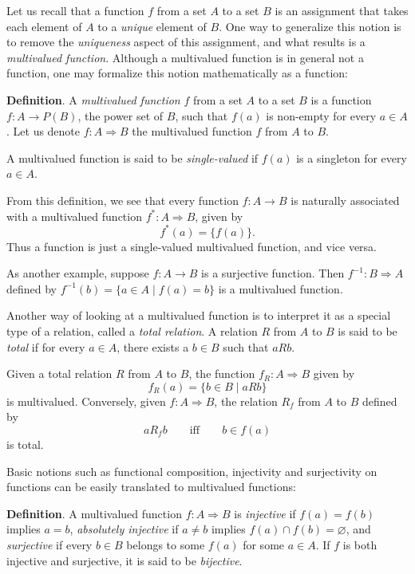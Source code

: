 \documentclass[12pt]{article}
\begin{document}
Let us recall that a function $f$ from a set $A$ to a set $B$ is an assignment that takes each element of $A$ to a \emph{unique} element of $B$.  One way to generalize this notion is to remove the \emph{uniqueness} aspect of this assignment, and what results is a \emph{multivalued function}.  Although a multivalued function is in general not a function, one may formalize this notion mathematically as a function:

\textbf{Definition}.  A \emph{multivalued function} $f$ from a set $A$ to a set $B$ is a function $f: A\to P(B)$, the power set of $B$, such that $f(a)$ is non-empty for every $a\in A$.  Let us denote $f:A\Rightarrow B$ the multivalued function $f$ from $A$ to $B$.  

A multivalued function is said to be \emph{single-valued} if $f(a)$ is a singleton for every $a\in A$.

From this definition, we see that every function $f:A\to B$ is naturally associated with a multivalued function $f^*:A\Rightarrow B$, given by $$f^*(a)=\lbrace f(a)\rbrace.$$  Thus a function is just a single-valued multivalued function, and vice versa.

As another example, suppose $f:A\to B$ is a surjective function.  Then $f^{-1}:B\Rightarrow A$ defined by $f^{-1}(b)=\lbrace a\in A \mid f(a)=b\rbrace$ is a multivalued function.

Another way of looking at a multivalued function is to interpret it as a special type of a relation, called a \emph{total relation}.  A relation $R$ from $A$ to $B$ is said to be \emph{total} if for every $a\in A$, there exists a $b\in B$ such that $aRb$.

Given a total relation $R$ from $A$ to $B$, the function $f_R: A\Rightarrow B$ given by $$f_R(a)=\lbrace b\in B\mid aRb\rbrace$$ is multivalued.  Conversely, given $f:A \Rightarrow  B$, the relation $R_f$ from $A$ to $B$ defined by $$a R_f b \qquad\mbox{iff}\qquad b\in f(a)$$ is total.

Basic notions such as functional composition, injectivity and surjectivity on functions can be easily translated to multivalued functions:

\textbf{Definition}.  A multivalued function $f:A\Rightarrow B$ is \emph{injective} if $f(a)=f(b)$ implies $a=b$, \emph{absolutely injective} if $a\ne b$ implies $f(a)\cap f(b)=\varnothing$, and \emph{surjective} if every $b\in B$ belongs to some $f(a)$ for some $a\in A$.  If $f$ is both injective and surjective, it is said to be \emph{bijective}.
\end{document}
